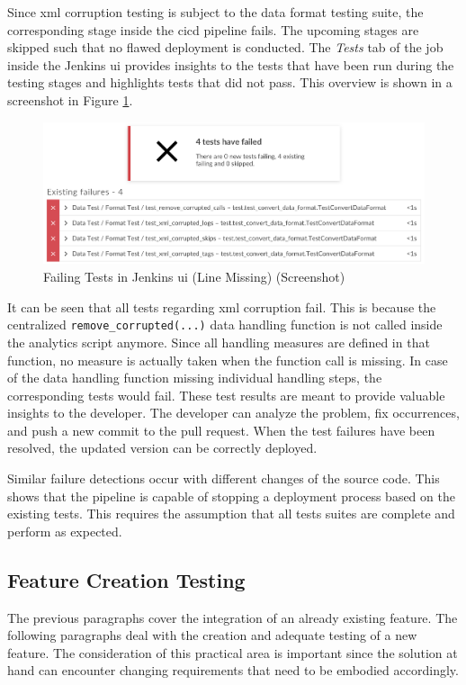 Since \ac{xml} corruption testing is subject to the data format testing suite, the corresponding stage inside the \ac{cicd} pipeline fails. The upcoming stages are skipped such that no flawed deployment is conducted. The \textit{Tests} tab of the job inside the Jenkins \ac{ui} provides insights to the tests that have been run during the testing stages and highlights tests that did not pass. This overview is shown in a screenshot in Figure \ref{fig:6-jenkins-tests}.
\newpage
\begin{figure}[h!]
	\centering
	\includegraphics[width=\linewidth]{main-matter/img/6-jenkins-tests}
	\caption{Failing Tests in Jenkins \acs{ui} (Line Missing) (Screenshot)}
	\label{fig:6-jenkins-tests}
\end{figure}

It can be seen that all tests regarding \ac{xml} corruption fail. This is because the centralized \texttt{remove\_corrupted(...)} data handling function is not called inside the analytics script anymore. Since all handling measures are defined in that function, no measure is actually taken when the function call is missing. In case of the data handling function missing individual handling steps, the corresponding tests would fail. These test results are meant to provide valuable insights to the developer. The developer can analyze the problem, fix occurrences, and push a new commit to the pull request. When the test failures have been resolved, the updated version can be correctly deployed.

Similar failure detections occur with different changes of the source code. This shows that the pipeline is capable of stopping a deployment process based on the existing tests. This requires the assumption that all tests suites are complete and perform as expected.

\subsection{Feature Creation Testing}
The previous paragraphs cover the integration of an already existing feature. The following paragraphs deal with the creation and adequate testing of a new feature. The consideration of this practical area is important since the solution at hand can encounter changing requirements that need to be embodied accordingly.

